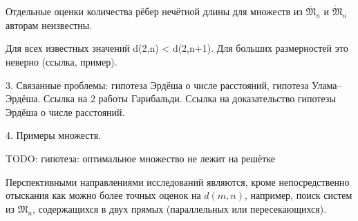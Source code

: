 Отдельные оценки количества рёбер нечётной длины для множеств из $\overline{\mathfrak{M}}_n$ и $\dot{\mathfrak{M}}_n$
авторам неизвестны.



Для всех известных значений d(2,n) < d(2,n+1).
Для больших размерностей это неверно (ссылка, пример).


3. Связанные проблемы: гипотеза Эрдёша о числе расстояний, гипотеза Улама--Эрдёша.
Ссылка на 2 работы Гарибальди. Ссылка на доказательство гипотезы Эрдёша о числе расстояний.

4. Примеры множеств.


TODO: гипотеза: оптимальное множество не лежит на решётке


Перспективными направлениями исследований являются, кроме непосредственно отыскания как можно более точных оценок на $d(m,n)$,
например, поиск систем из $\mathfrak{M}_n$, содержащихся в двух прямых (параллельных или пересекающихся).
